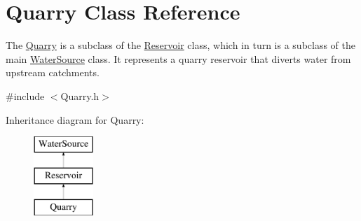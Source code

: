 \hypertarget{classQuarry}{}\section{Quarry Class Reference}
\label{classQuarry}


The {\ttfamily \mbox{\hyperlink{classQuarry}{Quarry}}} is a subclass of the {\ttfamily \mbox{\hyperlink{classReservoir}{Reservoir}}} class, which in turn is a subclass of the main {\ttfamily \mbox{\hyperlink{classWaterSource}{Water\+Source}}} class. It represents a quarry reservoir that diverts water from upstream catchments.  




{\ttfamily \#include $<$Quarry.\+h$>$}

Inheritance diagram for Quarry\+:\begin{figure}[H]
\begin{center}
\leavevmode
\includegraphics[height=3.000000cm]{classQuarry}
\end{center}
\end{figure}
